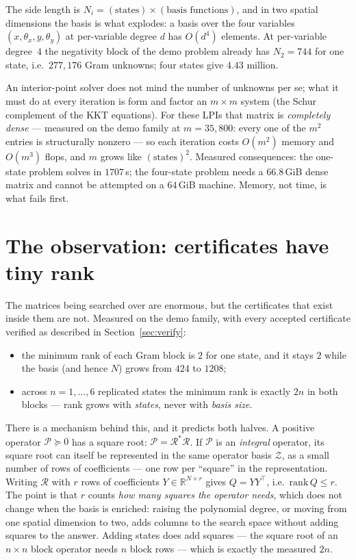 \documentclass[11pt]{article}
\newcommand{\PP}{\mathcal{P}}
\newcommand{\Z}{\mathcal{Z}}
\newcommand{\R}{\mathbb{R}}
\begin{document}
The side length is $N_i = (\text{states})\times(\text{basis functions})$, and
in two spatial dimensions the basis is what explodes: a basis over the four
variables $(x,\theta_x,y,\theta_y)$ at per-variable degree $d$ has
$O(d^4)$ elements. At per-variable degree~$4$ the negativity block of the
demo problem already has $N_2=744$ for one state, i.e.\ $277{,}176$ Gram
unknowns; four states give $4.43$ million.

An interior-point solver does not mind the number of unknowns per se; what it
must do at every iteration is form and factor an $m\times m$ system (the
Schur complement of the KKT equations). For these LPIs that matrix is
\emph{completely dense} --- measured on the demo family at $m=35{,}800$:
every one of the $m^2$ entries is structurally nonzero --- so each iteration
costs $O(m^2)$ memory and $O(m^3)$ flops, and $m$ grows like
$(\text{states})^2$. Measured consequences: the one-state problem solves in
$1707$\,s; the four-state problem needs a $66.8$\,GiB dense matrix and cannot
be attempted on a $64$\,GiB machine. Memory, not time, is what fails first.

\section{The observation: certificates have tiny rank}

The matrices being searched over are enormous, but the certificates that
exist inside them are not. Measured on the demo family, with every accepted
certificate verified as described in Section~\ref{sec:verify}:
\begin{itemize}
\item the minimum rank of each Gram block is $2$ for one state, and it stays
      $2$ while the basis (and hence $N$) grows from $424$ to $1208$;
\item across $n=1,\dots,6$ replicated states the minimum rank is exactly
      $2n$ in both blocks --- rank grows with \emph{states}, never with
      \emph{basis size}.
\end{itemize}

There is a mechanism behind this, and it predicts both halves. A positive
operator $\PP\succeq0$ has a square root: $\PP=\mathcal{R}^{*}\mathcal{R}$.
If $\PP$ is an \emph{integral} operator, its square root can itself be
represented in the same operator basis $\Z$, as a small number of rows of
coefficients --- one row per ``square'' in the representation. Writing
$\mathcal{R}$ with $r$ rows of coefficients $Y\in\R^{N\times r}$ gives
$Q=YY^{\top}$, i.e.\ $\mathrm{rank}\,Q\le r$. The point is that $r$ counts
\emph{how many squares the operator needs}, which does not change when the
basis is enriched: raising the polynomial degree, or moving from one spatial
dimension to two, adds columns to the search space without adding squares to
the answer. Adding states does add squares --- the square root of an
$n\times n$ block operator needs $n$ block rows --- which is exactly the
measured $2n$.
\end{document}
